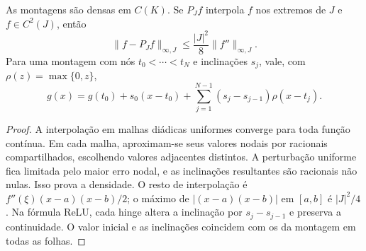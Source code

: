 \begin{proposition}\label{map:artigo_2:2.3}\label{artigo_2:prop:preliminary-facts}
As montagens são densas em $C(K)$. Se $P_Jf$ interpola $f$ nos extremos de $J$ e $f\in C^2(J)$, então
\begin{equation}
 \|f-P_Jf\|_{\infty,J}\le\frac{|J|^2}{8}\|f''\|_{\infty,J}.
 \label{artigo_2:eq:interpolation-remainder}
\end{equation}
Para uma montagem com nós $t_0<\cdots<t_N$ e inclinações $s_j$, vale, com $\rho(z)=\max\{0,z\}$,
\begin{equation}
 g(x)=g(t_0)+s_0(x-t_0)+\sum_{j=1}^{N-1}(s_j-s_{j-1})\rho(x-t_j).
 \label{artigo_2:eq:assembly-relu}
\end{equation}
\end{proposition}
\begin{proof}
A interpolação em malhas diádicas uniformes converge para toda função contínua. Em cada malha, aproximam-se seus valores nodais por racionais compartilhados, escolhendo valores adjacentes distintos. A perturbação uniforme fica limitada pelo maior erro nodal, e as inclinações resultantes são racionais não nulas. Isso prova a densidade. O resto de interpolação é $f''(\xi)(x-a)(x-b)/2$; o máximo de $|(x-a)(x-b)|$ em $[a,b]$ é $|J|^2/4$. Na fórmula ReLU, cada hinge altera a inclinação por $s_j-s_{j-1}$ e preserva a continuidade. O valor inicial e as inclinações coincidem com os da montagem em todas as folhas.
\end{proof}

